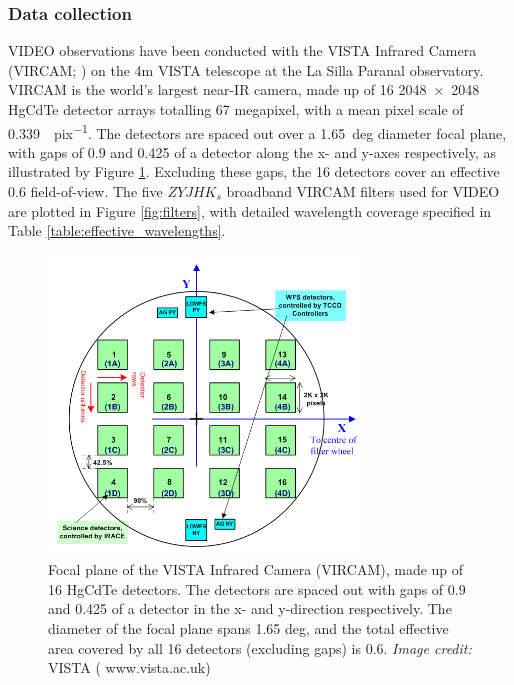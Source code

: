 \subsubsection{Data collection}\label{subsubsection:data_collection_video}
VIDEO observations have been conducted with the VISTA Infrared Camera (VIRCAM; \citealt{2006SPIE.6269E..0XD}) on the 4m VISTA telescope \citep{2004Msngr.117...27E, 2015A&A...575A..25S} at the La Silla Paranal observatory. VIRCAM is the world's largest near-IR camera, made up of 16 \num{2048 x 2048} HgCdTe detector arrays totalling 67 megapixel, with a mean pixel scale of \SI{0.339}{\arcsec.pix^{-1}}. The detectors are spaced out over a \SI{1.65}{deg} diameter focal plane, with gaps of 0.9 and 0.425 of a detector along the x- and y-axes respectively,  as illustrated by Figure \ref{fig:VIRCAM}. Excluding these gaps, the 16 detectors cover an effective \SI{0.6}{\sqdeg} field-of-view. The five $ZYJHK_{s}$ broadband VIRCAM filters used for VIDEO are plotted in Figure \ref{fig:filters}, with detailed wavelength coverage specified in Table \ref{table:effective_wavelengths}. \par

\begin{figure}[tbp] 
\centering    
\includegraphics[width=0.75\textwidth]{VIRCAM_detail.png}
\caption[VIRCAM focal plane]{Focal plane of the VISTA Infrared Camera (VIRCAM), made up of 16 HgCdTe detectors. The detectors are spaced out with gaps of 0.9 and 0.425 of a detector in the x- and y-direction respectively. The diameter of the focal plane spans 1.65 deg, and the total effective area covered by all 16 detectors (excluding gaps) is \SI{0.6}{\sqdeg}.  \textit{Image credit:} VISTA ({\color{blue} www.vista.ac.uk})}
\label{fig:VIRCAM}
\end{figure}



